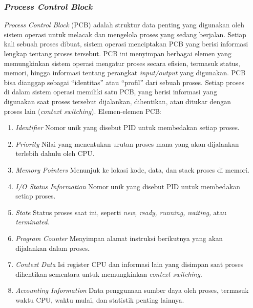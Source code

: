 \documentclass[12pt]{article}
\begin{document}
\subsubsection{\textit{Process Control Block}}
 \textit{Process Control Block} (PCB) adalah struktur data penting yang digunakan
 oleh sistem operasi untuk melacak dan mengelola proses yang sedang
 berjalan. Setiap kali sebuah proses dibuat, sistem operasi menciptakan PCB
 yang berisi informasi lengkap tentang proses tersebut. PCB ini
 menyimpan berbagai elemen yang memungkinkan sistem operasi
 mengatur proses secara efisien, termasuk status, memori, hingga informasi
 tentang perangkat \textit{input/output} yang digunakan.
 PCB bisa dianggap sebagai “identitas” atau “profil” dari sebuah proses.
 Setiap proses di dalam sistem operasi memiliki satu PCB, yang berisi
 informasi yang digunakan saat proses tersebut dijalankan, dihentikan, atau
 ditukar dengan proses lain (\textit{context switching}).
 \newline Elemen-elemen PCB:
 \begin{enumerate}
     \item \textit{Identifier}
        \newline Nomor unik yang disebut PID untuk membedakan setiap proses.
     \item \textit{Priority}
        \newline Nilai yang menentukan urutan proses mana yang akan dijalankan terlebih dahulu oleh CPU.
     \item \textit{Memory Pointers}
        \newline  Menunjuk ke lokasi kode, data, dan stack proses di memori.
     \item \textit{I/O Status Information}
        \newline Nomor unik yang disebut PID untuk membedakan setiap proses.
     \item \textit{State}
        \newline Status proses saat ini, seperti \textit{new, ready, running, waiting,} atau \textit{terminated}.
     \item \textit{Program Counter}
        \newline Menyimpan alamat instruksi berikutnya yang akan dijalankan dalam proses.
     \item \textit{Context Data}
        \newline  Isi register CPU dan informasi lain yang disimpan saat proses dihentikan sementara untuk memungkinkan \textit{context switching}.
     \item \textit{Accounting Information}
        \newline  Data penggunaan sumber daya oleh proses, termasuk waktu CPU, waktu mulai, dan statistik penting lainnya.
 \end{enumerate}
\end{document}
